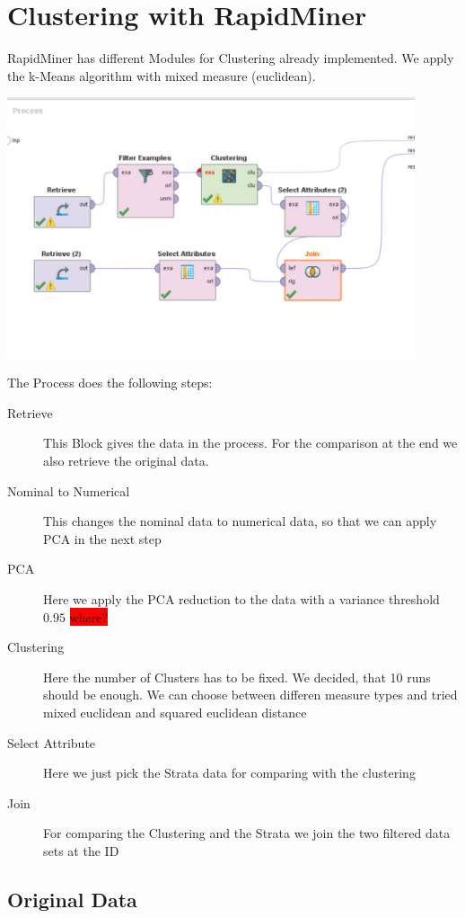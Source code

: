\section{Clustering with RapidMiner}

RapidMiner has different Modules for Clustering already implemented. We apply the k-Means algorithm with mixed measure (euclidean).

\includegraphics[width=0.9\textwidth]{ClusteringRapid.PNG}


The Process does the following steps:
\begin{description}
	\item[Retrieve] This Block gives the data in the process. For the comparison at the end we also retrieve the original data.
	\item[Nominal to Numerical] This changes the nominal data to numerical data, so that we can apply PCA in the next step
	\item[PCA] Here we apply the PCA reduction to the data with a variance threshold $0.95$ \colorbox{red}{where?}
	\item[Clustering] Here the number of Clusters has to be fixed. We decided, that 10 runs should be enough. We can choose between differen measure types and tried mixed euclidean and squared euclidean distance
	\item[Select Attribute] Here we just pick the Strata data for comparing with the clustering
	\item[Join] For comparing the Clustering and the Strata we join the two filtered data sets at the ID
\end{description}

\subsection{Original Data}

